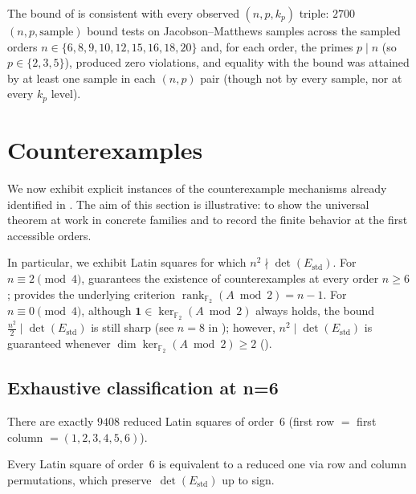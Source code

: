 \documentclass[11pt,a4paper]{article}
\newcommand{\FF}{\mathbb{F}}
\newcommand{\one}{\mathbf{1}}
\newcommand{\rank}{\operatorname{rank}}
\newcommand{\Estd}{E_{\mathrm{std}}}
\begin{document}
\begin{remark}
The bound of  is consistent with every observed
$(n,p,k_p)$ triple: $2700$ $(n,p,\mathrm{sample})$ bound tests on
Jacobson--Matthews samples across the sampled
orders $n\in\{6,8,9,10,12,15,16,18,20\}$ and, for each order, the primes
$p\mid n$ (so $p\in\{2,3,5\}$), produced zero violations, and equality with
the bound was attained by at least one sample in each $(n,p)$ pair (though
not by every sample, nor at every $k_p$ level).
\end{remark}

\section{Counterexamples}\label{sec:counterexamples}

We now exhibit explicit instances of the counterexample mechanisms already
identified in .  The aim of this section is illustrative:
to show the universal theorem at work in concrete families and to record
the finite behavior at the first accessible orders.

In particular, we exhibit Latin squares for which $n^2\nmid\det(\Estd)$.
For $n\equiv 2\pmod{4}$,  guarantees
the existence of counterexamples at every order $n\ge 6$;
 provides the underlying criterion
$\rank_{\FF_2}(A\bmod 2)=n-1$.
For $n\equiv 0\pmod{4}$, although
$\one\in\ker_{\FF_2}(A\bmod 2)$ always holds, the bound
$\frac{n^2}{2}\mid\det(\Estd)$ is still sharp (see $n=8$ in
); however, $n^2\mid\det(\Estd)$ is guaranteed
whenever $\dim\ker_{\FF_2}(A\bmod 2)\ge 2$ ().

\subsection{Exhaustive classification at n=6}

{\sloppy There are exactly $9408$ reduced Latin squares of order~$6$ (first row
${}={}$ first column ${}= (1,2,3,4,5,6)$).\par}  Every Latin square of
order~$6$ is equivalent to a reduced one via row and column permutations,
which preserve~$\det(\Estd)$ up to sign.
\end{document}
